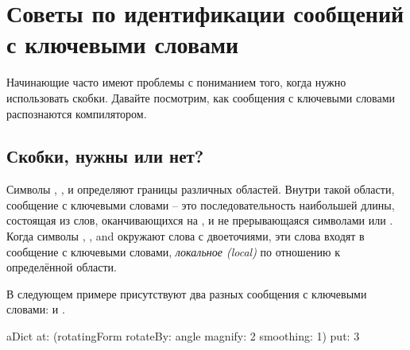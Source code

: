 \documentclass[a4paper,10pt,twoside]{book}
\begin{document}
\section{Советы по идентификации сообщений с ключевыми словами}
Начинающие часто имеют проблемы с пониманием того, когда нужно использовать скобки. Давайте посмотрим, как сообщения с ключевыми словами распознаются компилятором.

\subsection{Скобки, нужны или нет?}
Символы \ct{[}, \ct{]}, \ct{(} и \ct{)} 
определяют границы различных областей. Внутри такой области, сообщение с ключевыми словами -- это последовательность наибольшей длины, состоящая из слов, оканчивающихся на \ct{:}, и не прерывающаяся символами  или \ct{;}. 
Когда символы \ct{[}, \ct{]}, \ct{(} and \ct{)} окружают слова с двоеточиями, эти слова входят в сообщение с ключевыми словами, \emph{локальное (local)} по отношению к определённой области.

В следующем примере присутствуют два разных сообщения с ключевыми словами:  и .

\begin{code}{}
aDict
   at: (rotatingForm 
          rotateBy: angle	
          magnify: 2 
          smoothing: 1)
   put: 3
\end{code}
\end{document}
